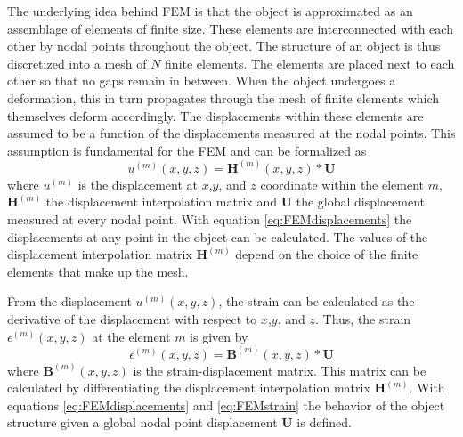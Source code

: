 \documentclass[11pt,a4paper]{report}
\begin{document}
The underlying idea behind FEM is that the object is approximated as an
assemblage of elements of finite size. These elements are interconnected with
each other by nodal points throughout the object. The structure of an object is
thus discretized into a mesh of $N$ finite elements. The elements are placed
next to each other so that no gaps remain in between. When the object undergoes a
deformation, this in turn propagates through the mesh of finite elements which
themselves deform accordingly. The displacements within these elements are assumed to be a function
of the displacements measured at the nodal points. This assumption is
fundamental for the FEM and can be formalized as
\begin{equation}\label{eq:FEMdisplacements}
u^{(m)}(x,y,z) = \mathbf{H}^{(m)}(x,y,z)*\mathbf{U}
\end{equation}
where $u^{(m)}$ is the displacement at $x$,$y$, and $z$ coordinate within the element $m$, $\mathbf{H}^{(m)}$
the displacement interpolation matrix and $\mathbf{U}$ the global
displacement measured at every nodal point. With equation
\ref{eq:FEMdisplacements} the displacements at any point in the object can be calculated.
The values of the displacement interpolation matrix $\mathbf{H}^{(m)}$ depend on
the choice of the finite elements that make up the mesh.

From the displacement $u^{(m)}(x,y,z)$, the strain can be calculated as the
derivative of the displacement with respect to $x$,$y$, and $z$. Thus, the
strain $\epsilon^{(m)}(x,y,z)$ at the element $m$ is given by  
\begin{equation}\label{eq:FEMstrain}
\epsilon^{(m)}(x,y,z) = \mathbf{B}^{(m)}(x,y,z)*\mathbf{U}
\end{equation}
where $\mathbf{B}^{(m)}(x,y,z)$ is the strain-displacement matrix. This matrix can
be calculated by differentiating the displacement interpolation matrix
$\mathbf{H}^{(m)}$. With equations \ref{eq:FEMdisplacements} and \ref{eq:FEMstrain} the behavior of
the object structure given a global nodal point displacement $\mathbf{U}$ is
defined. 
\end{document}
